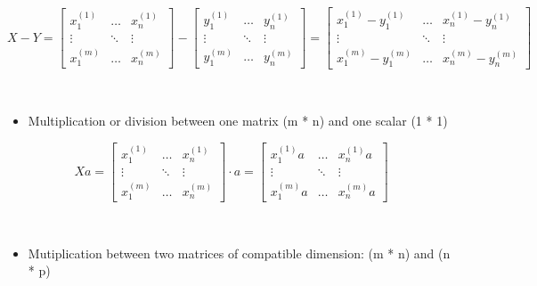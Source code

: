 \documentclass[]{article}
\providecommand{\tightlist}{%
  \setlength{\itemsep}{0pt}\setlength{\parskip}{0pt}}
\begin{document}
\[
X - Y = 
\begin{bmatrix} 
x_{1}^{(1)} & \dots & x_{n}^{(1)}  \\ 
\vdots & \ddots & \vdots \\ 
x_{1}^{(m)} & \dots & x_{n}^{(m)} 
\end{bmatrix} - 
\begin{bmatrix} 
y_{1}^{(1)} & \dots & y_{n}^{(1)}  \\ 
\vdots & \ddots & \vdots \\ 
y_{1}^{(m)} & \dots & y_{n}^{(m)} 
\end{bmatrix} = 
\begin{bmatrix} 
x_{1}^{(1)} - y_{1}^{(1)}  & \dots & x_{n}^{(1)} - y_{n}^{(1)}  \\ 
\vdots & \ddots & \vdots \\ 
x_{1}^{(m)} - y_{1}^{(m)} & \dots & x_{n}^{(m)} - y_{n}^{(m)}
\end{bmatrix}
\] \normalsize

​

\begin{itemize}
\tightlist
\item
  Multiplication or division between one matrix (m * n) and one scalar
  (1 * 1)
\end{itemize}

\large

\[
Xa = 
\begin{bmatrix} 
x_{1}^{(1)} & \dots & x_{n}^{(1)}  \\ 
\vdots & \ddots & \vdots \\ 
x_{1}^{(m)} & \dots & x_{n}^{(m)} 
\end{bmatrix} 
\cdot a
= 
\begin{bmatrix} 
x_{1}^{(1)} a  & \dots & x_{n}^{(1)} a  \\ 
\vdots & \ddots & \vdots \\ 
x_{1}^{(m)} a & \dots & x_{n}^{(m)} a
\end{bmatrix}
\] \normalsize

​

\begin{itemize}
\tightlist
\item
  Mutiplication between two matrices of compatible dimension: (m * n)
  and (n * p)
\end{itemize}

\large
\end{document}
